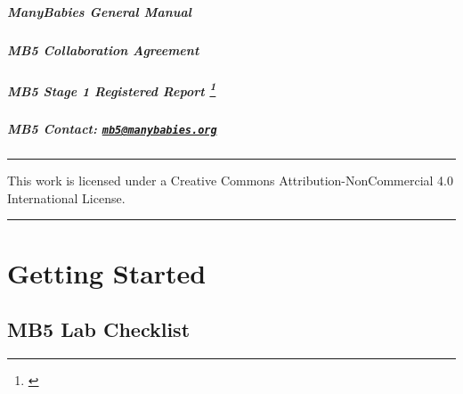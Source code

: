 \documentclass[
]{book}
\begin{document}
\hypertarget{manybabies-general-manual}{%
\paragraph*{ManyBabies General Manual}\label{manybabies-general-manual}}

\hypertarget{mb5-collaboration-agreement}{%
\paragraph*{MB5 Collaboration Agreement}\label{mb5-collaboration-agreement}}

\hypertarget{mb5-stage-1-registered-report}{%
\paragraph*{\texorpdfstring{MB5 Stage 1 Registered Report \footnote{\citet{kosiezettersten2024}}}{MB5 Stage 1 Registered Report }}\label{mb5-stage-1-registered-report}}

\hypertarget{mb5-contact-mb5manybabies.org}{%
\paragraph*{\texorpdfstring{MB5 Contact: \href{mailto:mb5@manybabies.org}{\nolinkurl{mb5@manybabies.org}} }{MB5 Contact: mb5@manybabies.org }}\label{mb5-contact-mb5manybabies.org}}

\begin{center}\rule{0.5\linewidth}{0.5pt}\end{center}

This work is licensed under a Creative Commons Attribution-NonCommercial 4.0 International License.

\begin{center}\rule{0.5\linewidth}{0.5pt}\end{center}

\hypertarget{getting-started}{%
\chapter{Getting Started}\label{getting-started}}

\hypertarget{mb5-lab-checklist}{%
\section*{MB5 Lab Checklist}\label{mb5-lab-checklist}}
\end{document}

